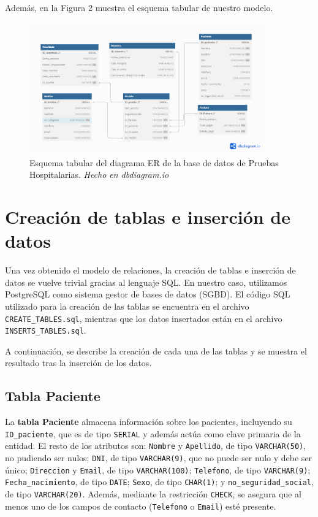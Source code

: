 \documentclass[spanish]{article}
\begin{document}
Además, en la Figura 2 muestra el esquema tabular de nuestro modelo.

\newpage 

\begin{figure}[htbp]
    \centering
    \includegraphics[width=0.9\textwidth]{Diagramas/Modelo_ER.png}
    \caption{Esquema tabular del diagrama ER de la base de datos de Pruebas Hospitalarias. \textit{Hecho en dbdiagram.io}}
    \label{fig:diagrama_er}
\end{figure}

\newpage
\section{Creación de tablas e inserción de datos}
Una vez obtenido el modelo de relaciones, la creación de tablas e inserción de datos se vuelve trivial gracias al lenguaje SQL. En nuestro caso, utilizamos PostgreSQL como sistema gestor de bases de datos (SGBD). El código SQL utilizado para la creación de las tablas se encuentra en el archivo \texttt{CREATE\_TABLES.sql}, mientras que los datos insertados están en el archivo \texttt{INSERTS\_TABLES.sql}.

A continuación, se describe la creación de cada una de las tablas y se muestra el resultado tras la inserción de los datos.


\subsection{Tabla Paciente}
La \textbf{tabla Paciente} almacena información sobre los pacientes, incluyendo su \texttt{ID\_paciente}, que es de tipo \texttt{SERIAL} y además actúa como clave primaria de la entidad. El resto de los atributos son: \texttt{Nombre} y \texttt{Apellido}, de tipo \texttt{VARCHAR(50)}, no pudiendo ser nulos; \texttt{DNI}, de tipo \texttt{VARCHAR(9)}, que no puede ser nulo y debe ser único; \texttt{Direccion} y \texttt{Email}, de tipo \texttt{VARCHAR(100)}; \texttt{Telefono}, de tipo \texttt{VARCHAR(9)}; \texttt{Fecha\_nacimiento}, de tipo \texttt{DATE}; \texttt{Sexo}, de tipo \texttt{CHAR(1)}; y \texttt{no\_seguridad\_social}, de tipo \texttt{VARCHAR(20)}. Además, mediante la restricción \texttt{CHECK}, se asegura que al menos uno de los campos de contacto (\texttt{Telefono} o \texttt{Email}) esté presente.
\end{document}
